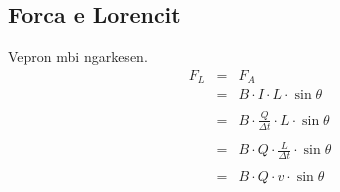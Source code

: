 \documentclass[a4paper, twocolumn]{article}
\begin{document}
\subsection{Forca e Lorencit}
Vepron mbi ngarkesen.
\begin{eqnarray*}
	F_{L} &=& F_{A}\\
	      &=&B\cdot I\cdot L\cdot \sin{\theta}\\
	      \\
	      &=&B\cdot \frac{Q}{\Delta t} \cdot L \cdot \sin{\theta}\\
	      \\
	      &=&B\cdot Q\cdot \frac{L}{\Delta t}  \cdot \sin{\theta}\\
	      \\
	      &=&B\cdot Q\cdot v\cdot \sin{\theta}\\
\end{eqnarray*}
\end{document}
